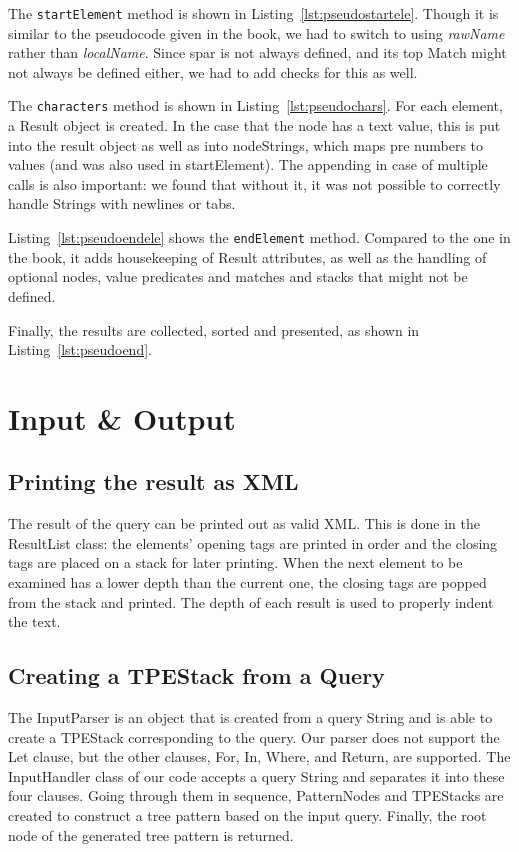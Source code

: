 \documentclass[11pt]{article}
\begin{document}
The \lstinline{startElement} method is shown in Listing~\ref{lst:pseudostartele}. Though it is similar to the pseudocode given in the book, we had to switch to using \emph{rawName} rather than \emph{localName}. Since spar is not always defined, and its top Match might not always be defined either, we had to add checks for this as well.

The \lstinline{characters} method is shown in Listing~\ref{lst:pseudochars}. For each element, a Result object is created. 
In the case that the node has a text value, this is put into the result object as well as into nodeStrings, which maps pre numbers to values (and was also used in startElement).
The appending in case of multiple calls is also important: we found that without it, it was not possible to correctly handle Strings with newlines or tabs.

Listing~\ref{lst:pseudoendele} shows the \lstinline{endElement} method. Compared to the one in the book, it adds housekeeping of Result attributes, as well as the handling of optional nodes, value predicates and matches and stacks that might not be defined.

Finally, the results are collected, sorted and presented, as shown in Listing~\ref{lst:pseudoend}.

\section{Input \& Output}
\subsection{Printing the result as XML}
The result of the query can be printed out as valid XML. This is done in the ResultList class: the elements' opening tags are printed in order and the closing tags are placed on a stack for later printing. When the next element to be examined has a lower depth than the current one, the closing tags are popped from the stack and printed. The depth of each result is used to properly indent the text.

\subsection{Creating a TPEStack from a Query}
The InputParser is an object that is created from a query String and is able to create a TPEStack corresponding to the query. Our parser does not support the Let clause, but the other clauses, For, In, Where, and Return, are supported. The InputHandler class of our code accepts a query String and separates it into these four clauses. Going through them in sequence, PatternNodes and TPEStacks are created to construct a tree pattern based on the input query. Finally, the root node of the generated tree pattern is returned.
\end{document}
